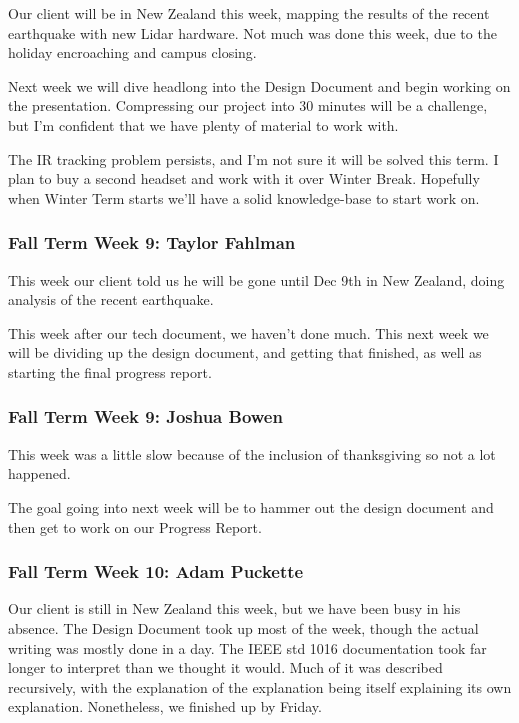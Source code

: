 \documentclass[draftclsnofoot,onecolumn]{IEEEtran}
\begin{document}
Our client will be in New Zealand this week, mapping the results of the recent earthquake with new Lidar hardware. Not much was done this week, due to the holiday encroaching and campus closing.

Next week we will dive headlong into the Design Document and begin working on the presentation. Compressing our project into 30 minutes will be a challenge, but I'm confident that we have plenty of material to work with.

The IR tracking problem persists, and I'm not sure it will be solved this term. I plan to buy a second headset and work with it over Winter Break. Hopefully when Winter Term starts we'll have a solid knowledge-base to start work on.

\subsubsection{Fall Term Week 9: Taylor Fahlman}

This week our client told us he will be gone until Dec 9th in New Zealand, doing analysis of the recent earthquake.

This week after our tech document, we haven't done much. This next week we will be dividing up the design document, and getting that finished, as well as starting the final progress report.

\subsubsection{Fall Term Week 9: Joshua Bowen}

This week was a little slow because of the inclusion of thanksgiving so not a lot happened.

The goal going into next week will be to hammer out the design document and then get to work on our Progress Report.

\subsubsection{Fall Term Week 10: Adam Puckette}

Our client is still in New Zealand this week, but we have been busy in his absence. The Design Document took up most of the week, though the actual writing was mostly done in a day. The IEEE std 1016 documentation took far longer to interpret than we thought it would. Much of it was described recursively, with the explanation of the explanation being itself explaining its own explanation. Nonetheless, we finished up by Friday.
\end{document}
